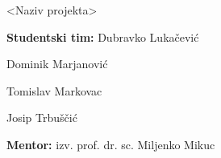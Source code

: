 \begin{titlepage}
	 \thispagestyle{empty}
	 \vspace*{5\baselineskip}
	 \centerline{\huge \textless Naziv projekta\textgreater}
	 \vspace*{3\baselineskip}
	 \centerline{\Large \textbf{Studentski tim:} Dubravko Lukačević }
	 \centerline{\hspace{4.7cm} \Large Dominik Marjanović }
	 \centerline{\hspace*{4.5cm} \Large Tomislav Markovac }
	 \centerline{\hspace{3.1cm} \Large Josip Trbuščić}
	 \vspace*{4\baselineskip}
	 \centerline{\Large \textbf{Mentor:} izv. prof. dr. sc. Miljenko Mikuc}
\end{titlepage}

